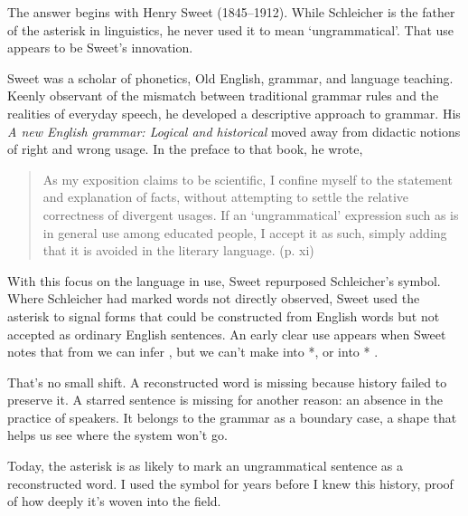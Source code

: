 The answer begins with Henry Sweet (1845--1912). While Schleicher is the
father of the asterisk in linguistics, he never used it to mean
`ungrammatical'. That use appears to be Sweet's innovation.

Sweet was a scholar of phonetics, Old English, grammar, and language
teaching. Keenly observant of the mismatch between traditional grammar
rules and the realities of everyday speech, he developed a descriptive
approach to grammar. His \textit{A new English grammar: Logical and
historical} moved away from didactic notions of right and wrong
usage. In the preface to that book, he wrote,

\begin{quote}
    As my exposition claims to be scientific, I confine myself
to the statement and explanation of facts, without attempting
to settle the relative correctness of divergent usages. If an
`ungrammatical' expression such as  is in general
use among educated people, I accept it as such, simply
adding that it is avoided in the literary language. \phantom{~ }\hfill(p. xi)
\end{quote}

With this focus on the language in use, Sweet repurposed Schleicher's
symbol. Where Schleicher had marked words not directly observed, Sweet
used the asterisk to signal forms that could be constructed from English
words but not accepted as ordinary English sentences. An early clear use
appears when Sweet notes that from  we can infer
, but we can't make 
into *, or  into
* \citep[14]{Sweet}.

That's no small shift. A reconstructed word is missing because
history failed to preserve it. A starred sentence is missing for another
reason: an absence in the practice of speakers. It belongs to the
grammar as a boundary case, a shape that helps us see where the system
won't go.

Today, the asterisk is as likely to mark an ungrammatical sentence as a
reconstructed word. I used the symbol for years before I knew this
history, proof of how deeply it's woven into the field.

